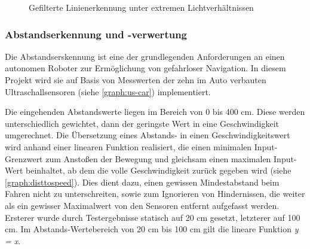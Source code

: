 \documentclass[12pt, a4paper]{scrartcl}
\begin{document}
\begin{figure}
	\caption{Gefilterte Linienerkennung unter extremen Lichtverhältnissen}
	\label{img:line_filt_viel_u_wenig_licht}
\end{figure}
 

\subsubsection{Abstandserkennung und -verwertung}
Die Abstandserskennung ist eine der grundlegenden Anforderungen an einen autonomen Roboter zur Ermöglichung von gefahrloser Navigation. In diesem Projekt wird sie auf Basis von Messwerten der zehn im Auto verbauten Ultraschallsensoren (siehe \autoref{graph:us-car})  implementiert.

Die eingehenden Abstandswerte liegen im Bereich von 0 bis 400 cm. Diese werden unterschiedlich gewichtet, dann der geringste Wert in eine Geschwindigkeit umgerechnet. Die Übersetzung eines Abstands- in einen Geschwindigkeitswert wird anhand einer linearen Funktion realisiert, die einen minimalen  Input-Grenzwert zum Anstoßen der Bewegung und gleichsam einen maximalen Input-Wert beinhaltet, ab dem die volle Geschwindigkeit zurück gegeben wird (siehe \autoref{graph:disttospeed}). Dies dient dazu, einen gewissen Mindestabstand beim Fahren nicht zu unterschreiten, sowie zum Ignorieren von Hindernissen, die weiter als ein gewisser Maximalwert von den Sensoren entfernt aufgefasst werden. Ersterer wurde durch Testergebnisse statisch auf 20 cm gesetzt, letzterer auf 100 cm. Im Abstands-Wertebereich von 20 cm bis 100 cm gilt die lineare Funktion \emph{y = x}.
\end{document}
